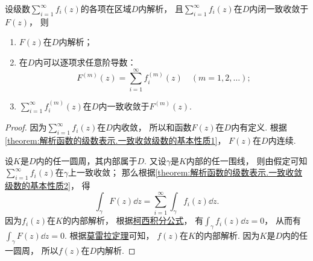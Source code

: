 \begin{theorem}[魏尔斯特拉斯定理]\label{theorem:解析函数的级数表示.魏尔斯特拉斯定理}
设级数\(\sum_{i=1}^\infty f_i(z)\)的各项在区域\(D\)内解析，
且\(\sum_{i=1}^\infty f_i(z)\)在\(D\)内闭一致收敛于\(F(z)\)，
则\begin{enumerate}
	\item \(F(z)\)在\(D\)内解析；

	\item 在\(D\)内可以逐项求任意阶导数：\begin{equation*}
		F^{(m)}(z) = \sum_{i=1}^\infty f_i^{(m)}(z)
		\quad(m=1,2,\dotsc);
	\end{equation*}

	\item \(\sum_{i=1}^\infty f_i^{(m)}(z)\)在\(D\)内一致收敛于\(F^{(m)}(z)\).
\end{enumerate}
\begin{proof}
因为\(\sum_{i=1}^\infty f_i(z)\)在\(D\)内收敛，
所以和函数\(F(z)\)在\(D\)内有定义.
根据\cref{theorem:解析函数的级数表示.一致收敛级数的基本性质1}，
\(F(z)\)在\(D\)内连续.

设\(K\)是\(D\)内的任一圆周，其内部属于\(D\).
又设\(\gamma\)是\(K\)内部的任一围线，
则由假定可知\(\sum_{i=1}^\infty f_i(z)\)在\(\gamma\)上一致收敛；
那么根据\cref{theorem:解析函数的级数表示.一致收敛级数的基本性质2}，
得\begin{equation*}
	\int_\gamma F(z) \dd{z} = \sum_{i=1}^\infty \int_\gamma f_i(z) \dd{z}.
\end{equation*}
因为\(f_i(z)\)在\(K\)的内部解析，
根据\hyperref[equation:解析函数的积分表示.柯西积分公式]{柯西积分公式}，
有\(\int_\gamma f_i(z) \dd{z} = 0\)，
从而有\(\int_\gamma F(z) \dd{z} = 0\).
根据\hyperref[theorem:解析函数的积分表示.莫雷拉定理]{莫雷拉定理}可知，
\(f(z)\)在\(K\)的内部解析.
因为\(K\)是\(D\)内的任一圆周，
所以\(f(z)\)在\(D\)内解析.


\end{proof}
\end{theorem}
